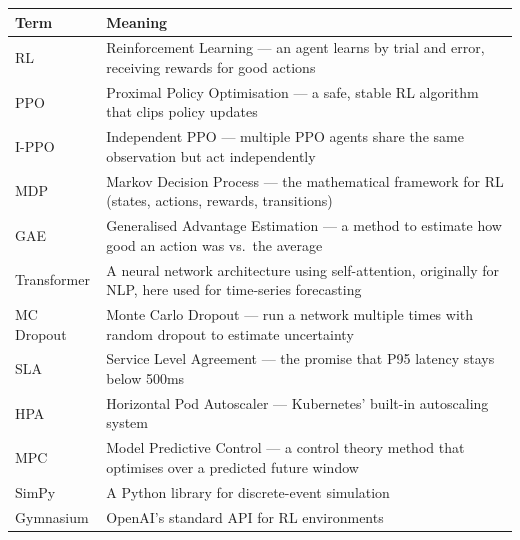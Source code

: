 \documentclass[11pt,a4paper]{article}
\begin{document}
\begin{center}
\begin{tabular}{lp{10cm}}
\toprule
\textbf{Term} & \textbf{Meaning} \\
\midrule
RL & Reinforcement Learning --- an agent learns by trial and error, receiving
     rewards for good actions \\
PPO & Proximal Policy Optimisation --- a safe, stable RL algorithm that clips
      policy updates \\
I-PPO & Independent PPO --- multiple PPO agents share the same observation but
        act independently \\
MDP & Markov Decision Process --- the mathematical framework for RL (states,
      actions, rewards, transitions) \\
GAE & Generalised Advantage Estimation --- a method to estimate how good an
      action was vs.\ the average \\
Transformer & A neural network architecture using self-attention, originally
              for NLP, here used for time-series forecasting \\
MC Dropout & Monte Carlo Dropout --- run a network multiple times with random
             dropout to estimate uncertainty \\
SLA & Service Level Agreement --- the promise that P95 latency stays below
      500ms \\
HPA & Horizontal Pod Autoscaler --- Kubernetes' built-in autoscaling system \\
MPC & Model Predictive Control --- a control theory method that optimises over
      a predicted future window \\
SimPy & A Python library for discrete-event simulation \\
Gymnasium & OpenAI's standard API for RL environments \\
\bottomrule
\end{tabular}
\end{center}
\end{document}

